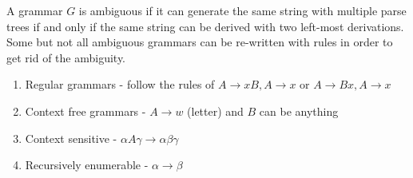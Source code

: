 \documentclass[a4paper]{article}
\theoremstyle{plain}
\theoremstyle{definition}
\newtheorem{defn}{Definition}[section]
\theoremstyle{remark}
\begin{document}
\begin{tcolorbox}[colback=black!3!white,colframe=black!60!white,title=\begin{defn}Ambiguity \label{Ambiguity}\end{defn}]
A grammar $G$ is ambiguous if it can generate the same string with multiple parse trees if and only if the same string can be derived with two left-most derivations. Some but not all ambiguous grammars can be re-written with rules in order to get rid of the ambiguity. 
\end{tcolorbox}
\begin{tcolorbox}[colback=black!3!white,colframe=black!60!white,title=\begin{defn}Chomsky hierarchy of Grammars \label{Chomsky hierarchy of Grammars}\end{defn}]
\begin{enumerate}
	\item Regular grammars - follow the rules of $A \to xB, A\to x$ or $A \to Bx, A\to x$
	\item Context free grammars - $A \to w$ (letter) and $B$ can be anything
	\item Context sensitive - $\alpha A \gamma \to \alpha \beta \gamma$
	\item Recursively enumerable - $\alpha \to \beta$
\end{enumerate}
\end{tcolorbox} 
\end{document}
